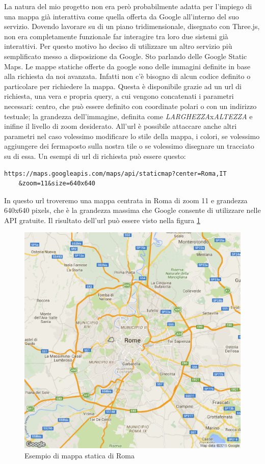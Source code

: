 La natura del mio progetto non era però probabilmente adatta per l'impiego di una mappa già interattiva come quella offerta da Google all'interno del suo servizio. Dovendo lavorare su di un piano tridimensionale, disegnato con Three.js, non era completamente funzionale far interagire tra loro due sistemi già interattivi. Per questo motivo ho deciso di utilizzare un altro servizio più semplificato messo a disposizione da Google. Sto parlando delle Google Static Maps. Le mappe statiche offerte da google sono delle immagini definite in base alla richiesta da noi avanzata. Infatti non c'è bisogno di alcun codice definito o particolare per richiedere la mappa. Questa è disponibile grazie ad un url di richiesta, una vera e propria query, a cui vengono concatenati i parametri necessari: centro, che può essere definito con coordinate polari o con un indirizzo testuale; la grandezza dell'immagine, definita come \textit{LARGHEZZA}x\textit{ALTEZZA} e inifine il livello di zoom desiderato. All'url è possibile attaccare anche altri parametri nel caso volessimo modificare lo stile della mappa, i colori, se volessimo aggiungere dei fermaposto sulla nostra tile o se volessimo disegnare un tracciato su di essa. Un esempi di url di richiesta può essere questo: 
\begin{lstlisting}
https://maps.googleapis.com/maps/api/staticmap?center=Roma,IT
	&zoom=11&size=640x640
\end{lstlisting}
In questo url troveremo una mappa centrata in Roma di zoom 11 e grandezza 640x640 pixels, che è la grandezza massima che Google consente di utilizzare nelle API gratuite. Il risultato dell'url può essere visto nella figura \ref{fig:staticmap}
\begin{figure}[ht]
	\centering
		\includegraphics[width=\textwidth]{figure/staticmap.eps}
		\caption{Esempio di mappa statica di Roma}\label{fig:staticmap}
\end{figure}